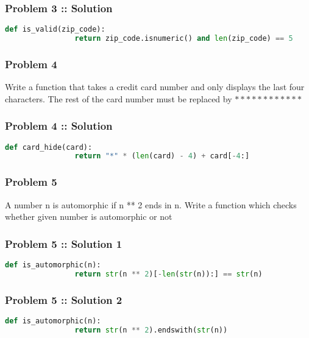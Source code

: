 \documentclass[14pt]{beamer}
\begin{document}
    \begin{frame}[containsverbatim]
        \frametitle{Problem 3 :: Solution}
        \begin{lstlisting}[language=Python]
            def is_valid(zip_code):
                return zip_code.isnumeric() and len(zip_code) == 5
        \end{lstlisting}
    \end{frame}
    \begin{frame}
        \frametitle{Problem 4}
        Write a function that takes a credit card number and only displays the last four characters. The rest of the card number must be replaced by $************$
    \end{frame}
    \begin{frame}[containsverbatim]
        \frametitle{Problem 4 :: Solution}
        \begin{lstlisting}[language=Python]
            def card_hide(card):
                return "*" * (len(card) - 4) + card[-4:]
        \end{lstlisting}
    \end{frame}
    \begin{frame}
        \frametitle{Problem 5}
        A number n is automorphic if {n ** 2} ends in n. Write a function which checks whether given number is automorphic or not
    \end{frame}
    \begin{frame}[containsverbatim]
        \frametitle{Problem 5 :: Solution 1}
        \begin{lstlisting}[language=Python]
            def is_automorphic(n):
                return str(n ** 2)[-len(str(n)):] == str(n)
        \end{lstlisting}
    \end{frame}
    \begin{frame}[containsverbatim]
        \frametitle{Problem 5 :: Solution 2}
        \begin{lstlisting}[language=Python]
            def is_automorphic(n):
                return str(n ** 2).endswith(str(n))
        \end{lstlisting}
    \end{frame}
\end{document}

